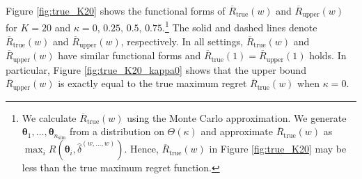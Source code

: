 \documentclass[12pt,a4paper]{article}
\begin{document}
Figure \ref{fig:true_K20} shows the functional forms of $\overline{R}_{\mathrm{true}}(w)$ and $\overline{R}_{\mathrm{upper}}(w)$ for $K=20$ and $\kappa = 0, \, 0.25, \, 0.5, \, 0.75$.\footnote{We calculate $\overline{R}_{\mathrm{true}}(w)$ using the Monte Carlo approximation. We generate $\bm{\theta}_1, \ldots, \bm{\theta}_{n_{\mathrm{sim}}}$ from a distribution on $\Theta(\kappa)$ and approximate $\overline{R}_{\mathrm{true}}(w)$ as $\max_{i} R(\bm{\theta}_i,\hat{\delta}^{(w,\ldots,w)})$. Hence, $\overline{R}_{\mathrm{true}}(w)$ in Figure \ref{fig:true_K20} may be less than the true maximum regret function.} The solid and dashed lines denote $\overline{R}_{\mathrm{true}}(w)$ and $\overline{R}_{\mathrm{upper}}(w)$, respectively. In all settings, $\overline{R}_{\mathrm{true}}(w)$ and $\overline{R}_{\mathrm{upper}}(w)$ have similar functional forms and $\overline{R}_{\mathrm{true}}(1)=\overline{R}_{\mathrm{upper}}(1)$ holds. In particular, Figure \ref{fig:true_K20_kappa0} shows that the upper bound $\overline{R}_{\mathrm{upper}}(w)$ is exactly equal to the true maximum regret $\overline{R}_{\mathrm{true}}(w)$ when $\kappa=0$.
\end{document}
